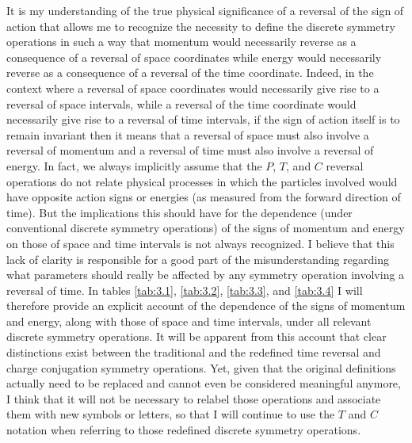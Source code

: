 \documentclass[notitlepage,12pt]{report}
\begin{document}
It is my understanding of the true physical significance of a reversal of the sign of action that allows me to recognize the necessity to define the discrete symmetry operations in such a way that momentum would necessarily reverse as a consequence of a reversal of space coordinates while energy would necessarily reverse as a consequence of a reversal of the time coordinate. Indeed, in the context where a reversal of space coordinates would necessarily give rise to a reversal of space intervals, while a reversal of the time coordinate would necessarily give rise to a reversal of time intervals, if the sign of action itself is to remain invariant then it means that a reversal of space must also involve a reversal of momentum and a reversal of time must also involve a reversal of energy. In fact, we always implicitly assume that the $P$, $T$, and $C$ reversal operations do not relate physical processes in which the particles involved would have opposite action signs or energies (as measured from the forward direction of time). But the implications this should have for the dependence (under conventional discrete symmetry operations) of the signs of momentum and energy on those of space and time intervals is not always recognized. I believe that this lack of clarity is responsible for a good part of the misunderstanding regarding what parameters should really be affected by any symmetry operation involving a reversal of time. In tables \ref{tab:3.1}, \ref{tab:3.2}, \ref{tab:3.3}, and \ref{tab:3.4} I will therefore provide an explicit account of the dependence of the signs of momentum and energy, along with those of space and time intervals, under all relevant discrete symmetry operations. It will be apparent from this account that clear distinctions exist between the traditional and the redefined time reversal and charge conjugation symmetry operations. Yet, given that the original definitions actually need to be replaced and cannot even be considered meaningful anymore, I think that it will not be necessary to relabel those operations and associate them with new symbols or letters, so that I will continue to use the $T$ and $C$ notation when referring to those redefined discrete symmetry operations.
\end{document}
